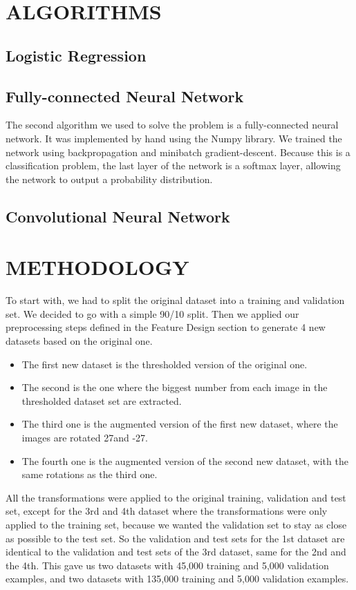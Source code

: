 \documentclass[letterpaper, 10 pt, conference]{ieeeconf}  %
\begin{document}
\section{ALGORITHMS}

\subsection{Logistic Regression}

\subsection{Fully-connected Neural Network}
The second algorithm we used to solve the problem is a fully-connected neural network. It was implemented by hand using the Numpy library. We trained the network using backpropagation and minibatch gradient-descent. Because this is a classification problem, the last layer of the network is a softmax layer, allowing the network to output a probability distribution.

\subsection{Convolutional Neural Network}


\section{METHODOLOGY}

To start with, we had to split the original dataset into a training and validation set. We decided to go with a simple 90/10 split. Then we applied our preprocessing steps defined in the Feature Design section to generate 4 new datasets based on the original one.

\begin{itemize}
\item The first new dataset is the thresholded version of the original one.
\item The second is the one where the biggest number from each image in the thresholded dataset set are extracted.
\item The third one is the augmented version of the first new dataset, where the images are rotated 27\degree and -27\degree.
\item The fourth one is the augmented version of the second new dataset, with the same rotations as the third one.
\end{itemize}

All the transformations were applied to the original training, validation and test set, except for the 3rd and 4th dataset where the transformations were only applied to the training set, because we wanted the validation set to stay as close as possible to the test set. So the validation and test sets for the 1st dataset are identical to the validation and test sets of the 3rd dataset, same for the 2nd and the 4th. This gave us two datasets with 45,000 training and 5,000 validation examples, and two datasets with 135,000 training and 5,000 validation examples.
\end{document}
